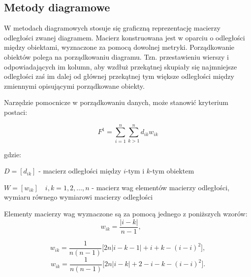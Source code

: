 \documentclass[12pt,a4paper]{report}
\begin{document}
\subsection{Metody diagramowe}


W metodach diagramowych stosuje się graficzną reprezentację macierzy odległości zwanej diagramem. Macierz konstruowana jest w oparciu o odległości między obiektami, wyznaczone za pomocą dowolnej metryki. Porządkowanie obiektów polega na porządkowaniu diagramu. Tzn. przestawieniu wierszy i odpowiadających im kolumn, aby wzdłuż przekątnej skupiały się najmniejsze odległości zaś im dalej od głównej przekątnej tym większe odległości między zmiennymi opisującymi porządkowane obiekty.  %

Narzędzie pomocnicze w porządkowaniu danych, może stanowić kryterium postaci:


$$
F^1= \sum_{i=1}^{n} \sum_{k>1}^{n} d_{ik}w_{ik}
$$

gdzie:

$D=[d_{ik}]$ - macierz odległości między $i$-tym i $k$-tym obiektem
 
$W=[w_{ik}] \quad i,k=1, 2, \ldots, n$ - macierz wag elementów macierzy odległości, wymiaru równego wymiarowi macierzy odległości
 
 
Elementy macierzy wag wyznaczone są za pomocą jednego z poniższych wzorów:
$$
w_{ik}=\frac{| i-k |}{n-1}, \qquad
$$

$$
w_{ik}=\frac{1}{n(n-1)}\lbrack{2n|i-k-1|+i+k-(i-i)^2\rbrack},
$$
$$
w_{ik}=\frac{1}{n(n-1)}\lbrack{2n|i-k|+2-i-k-(i-i)^2\rbrack}.
$$
 


\end{document}
